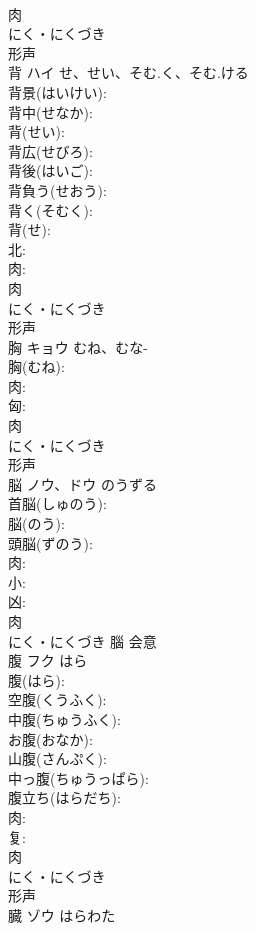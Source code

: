 \documentclass[8pt]{extreport}
\begin{document}
\begin{CJK}{UTF8}{min}
\\	肉	
\\	にく・にくづき	
\\	形声 
\\	背	ハイ	せ、せい、そむ.く、そむ.ける		
\\	背景(はいけい): 
\\	背中(せなか): 
\\	背(せい): 
\\	背広(せびろ): 
\\	背後(はいご): 
\\	背負う(せおう): 
\\	背く(そむく): 
\\	背(せ): 
\\	北: 
\\	肉: 
\\	肉	
\\	にく・にくづき	
\\	形声 
\\	胸	キョウ	むね、むな-		
\\	胸(むね): 
\\	肉: 
\\	匈: 
\\	肉	
\\	にく・にくづき	
\\	形声 
\\	脳	ノウ、ドウ	のうずる		
\\	首脳(しゅのう): 
\\	脳(のう): 
\\	頭脳(ずのう): 
\\	肉: 
\\	小: 
\\	凶: 
\\	肉	
\\	にく・にくづき	腦	会意 
\\	腹	フク	はら		
\\	腹(はら): 
\\	空腹(くうふく): 
\\	中腹(ちゅうふく): 
\\	お腹(おなか): 
\\	山腹(さんぷく): 
\\	中っ腹(ちゅうっぱら): 
\\	腹立ち(はらだち): 
\\	肉: 
\\	复: 
\\	肉	
\\	にく・にくづき	
\\	形声 
\\	臓	ゾウ	はらわた		

\end{CJK}
\end{document}
